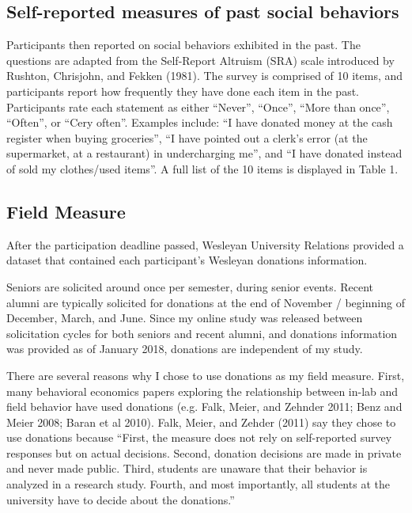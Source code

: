 \documentclass[12pt]{article}
\begin{document}
\subsection{Self-reported measures of past social behaviors}

Participants then reported on social behaviors exhibited in the past. The questions are adapted from the Self-Report Altruism (SRA) scale introduced by Rushton, Chrisjohn, and Fekken (1981). The survey is comprised of 10 items, and participants report how frequently they have done each item in the past. Participants rate each statement as either ``Never'', ``Once'', ``More than once'', ``Often'', or ``Cery often''. Examples include: ``I have donated money at the cash register when buying groceries'', ``I have pointed out a clerk\rq s error (at the supermarket, at a restaurant) in undercharging me'', and ``I have donated instead of sold my clothes/used items''. A full list of the 10 items is displayed in Table 1. 

\subsection{Field Measure}

After the participation deadline passed, Wesleyan University Relations provided a dataset that contained each participant\rq s Wesleyan donations information.

Seniors are solicited around once per semester, during senior events. Recent alumni are typically solicited for donations at the end of November / beginning of December, March, and June. Since my online study was released between solicitation cycles for both seniors and recent alumni, and donations information was provided as of January 2018, donations are independent of my study. 

There are several reasons why I chose to use donations as my field measure. First, many behavioral economics papers exploring the relationship between in-lab and field behavior have used donations (e.g. Falk, Meier, and Zehnder 2011; Benz and Meier 2008; Baran et al 2010). Falk, Meier, and Zehder (2011) say they chose to use donations because ``First, the measure does not rely on self-reported survey responses but on actual decisions. Second, donation decisions are made in private and never made public. Third, students are unaware that their behavior is analyzed in a research study. Fourth, and most importantly, all students at the university have to decide about the donations.''
\end{document}
